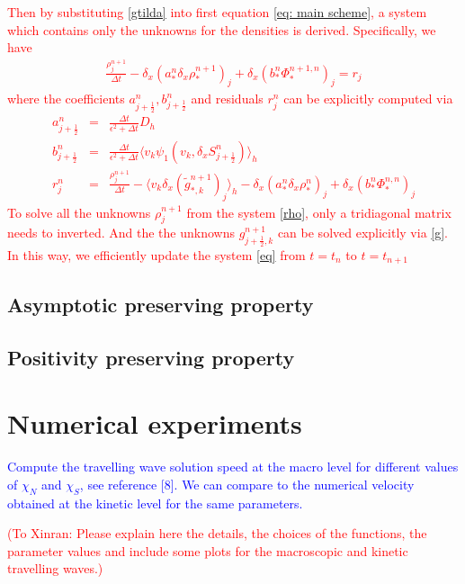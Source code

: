 \documentclass[11pt,twoside]{article}
\begin{document}
\textcolor{red}{
Then by substituting \ref{gtilda} into first equation \eqref{eq: main scheme}, a system which contains only the unknowns for the densities is derived. Specifically, we have  
\begin{eqnarray}\label{rho}
  \frac{\rho_j^{n+1}}{\Delta t}-\delta_x(a_*^n\delta_x\rho_*^{n+1})_j + \delta_x(b_*^n\Phi_*^{n+1,n})_j=r_j 
\end{eqnarray}
where the coefficients $a_{j+\frac{1}{2}}^n, b_{j+\frac{1}{2}}^n$ and residuals $r_j^n$ can be explicitly computed via
\begin{eqnarray}
    a_{j+\frac{1}{2}}^n&=&\frac{\Delta t}{\epsilon^2+\Delta t} D_h\nonumber\\
    b_{j+\frac{1}{2}}^n&=&\frac{\Delta t}{\epsilon^2+\Delta t} \langle v_k\psi_1(v_k,\delta_x S_{j+\frac{1}{2}}^n)\rangle_h\nonumber\\
    r_j^n&=&\frac{{\rho_j^{n+1}}}{\Delta t}-\langle v_k\delta_x(\tilde{g}_{*,k}^{n+1})_j\rangle_h-\delta_x(a_*^n\delta_x\rho_*^n)_j+\delta_x(b_*^n\Phi_*^{n,n})_j
    \end{eqnarray}
To solve all the unknowns $\rho_j^{n+1}$ from the system \eqref{rho}, only a tridiagonal matrix needs to inverted. And the the unknowns 
 $g_{j+\frac{1}{2},k}^{n+1}$ can be solved explicitly via \eqref{g}. In this way, we efficiently update the system \eqref{eq} from $t=t_n$ to $t=t_{n+1}$}



\subsection{Asymptotic preserving property}
\subsection{Positivity preserving property}
\section{Numerical experiments}
\textcolor{blue}{Compute the travelling wave solution speed at the macro level for different values of $\chi_N$ and $\chi_S$, see reference [8]. We can compare to the numerical velocity obtained at the kinetic level for the same parameters.}

\textcolor{red}{(To Xinran: Please explain here the details, the choices of the functions, the parameter values and include some plots for the macroscopic and kinetic travelling waves.)}
\end{document}
